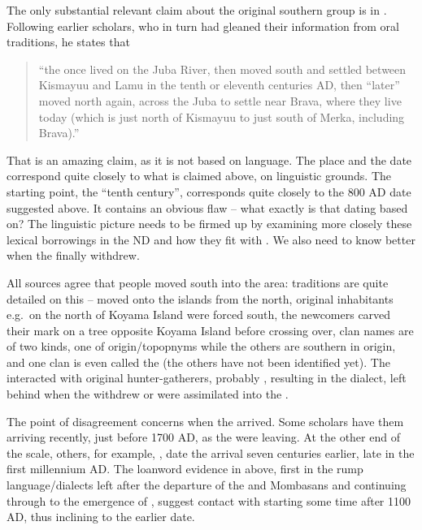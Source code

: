 \documentclass[output=paper,newtxmath,modfonts,nonflat,hidelinks]{langsci/langscibook}
\begin{document}
The only substantial relevant claim about the original southern  group is in \citet[15ff]{Lewis1969}. Following earlier  scholars, who in turn had gleaned their information from  oral traditions, he states that \begin{quotation}“the  once lived on the Juba River, then moved south and settled between Kismayuu and Lamu in the tenth or eleventh centuries AD, then “later” moved north again, across the Juba to settle near Brava, where they live today (which is just north of Kismayuu to just south of Merka, including Brava).”\end{quotation} That is an amazing claim, as it is not based on language. The place and the date correspond quite closely to what is claimed above, on linguistic grounds. The starting point, the “tenth century”, corresponds quite closely to the 800 AD date suggested above. It contains an obvious flaw – what exactly is that dating based on? The linguistic picture needs to be firmed up by examining more closely these lexical borrowings in the ND and how they fit with . We also need to know better when the  finally withdrew.

All sources agree that  people moved south into the area:  traditions are quite detailed on this –  moved onto the islands from the north, original inhabitants e.g.\ on the north of Koyama Island were forced south, the newcomers carved their mark on a tree opposite Koyama Island before crossing over,  clan names are of two kinds, one of  origin/topopnyms while the others are southern  in origin, and one clan is even called the  (the others have not been identified yet). The  interacted with original hunter-gatherers, probably , resulting in the  dialect, left behind when the  withdrew or were assimilated into the .  

The point of disagreement concerns when the  arrived. Some scholars have them arriving recently, just before 1700 AD, as the  were leaving. At the other end of the scale, others, for example, \citet{Ali1985}, date the  arrival seven centuries earlier, late in the first millennium AD. The loanword evidence in  above, first in the rump language/dialects left after the departure of the  and Mombasans and continuing through to the emergence of , suggest contact with  starting some time after 1100 AD, thus inclining to the earlier date.
\end{document}
